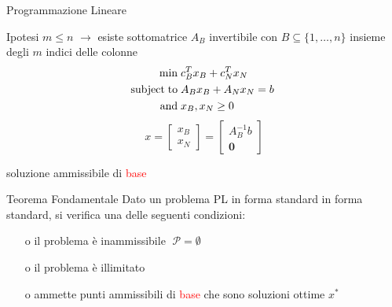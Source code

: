 
\begin{frame}{\textrm{Programmazione Lineare}}

Ipotesi $m \leq n$ \pause$\longrightarrow$ esiste sottomatrice $A_{B}$ invertibile con
$B\subseteq\{1,\dots,n\}$ insieme degli $m$ indici delle colonne 
\pause
\begin{equation*}
\begin{split}
\min\;&c_{B}^{T}x_{B}+c_{N}^{T}x_{N}\\
\text{subject\;to\;}&A_{B}x_{B}+A_{N}x_{N}= b\;\\\text{and\;}&x_{B},x_{N}\geq0
\end{split}
\end{equation*}
\pause
\begin{equation*}
x = \left[\begin{matrix}x_{B}\\x_{N}\end{matrix}\right] = \left[\begin{matrix}A_{B}^{-1}b\\\mathbf{0}\end{matrix}\right]
\end{equation*}
\begin{center}
	soluzione ammissibile di \textcolor{red}{base}
\end{center}
\end{frame}


\begin{frame}[t]{\textrm{Teorema Fondamentale}}
	Dato un problema PL in forma standard in forma standard, si verifica una delle seguenti condizioni:\pause
\begin{itemize}
\item[o] il problema è inammissibile $\;\mathcal{P}=\emptyset$\pause
\item[o] il problema è illimitato\pause
\item[o] ammette punti ammissibili di  \textcolor{red}{base} che sono soluzioni ottime $x^{*}$\pause
\end{itemize}
\end{frame}

